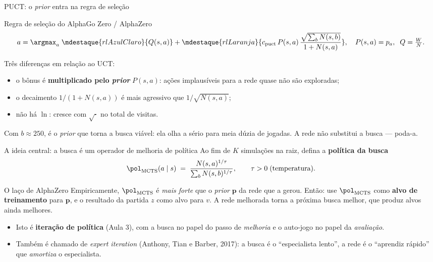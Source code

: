 \documentclass[aspectratio=169, 11pt]{beamer}
\newcommand{\Nv}[1]{N(#1)}                      %
\begin{document}
\begin{frame}{PUCT: o \emph{prior} entra na regra de seleção}
  \begin{teobox}{Regra de seleção do AlphaGo Zero / AlphaZero}
    \[
      a = \argmax_{a}\;
      \mdestaque{rlAzulClaro}{Q(s,a)}
      +
      \mdestaque{rlLaranja}{c_{\text{puct}}\, P(s,a)\,
      \frac{\sqrt{\sum_b \Nv{s,b}}}{1+\Nv{s,a}}},
      \quad P(s,a)=p_a,\;\; Q=\tfrac{W}{N} .
    \]
  \end{teobox}

  \pause
  Três diferenças em relação ao UCT:
  \begin{itemize}
    \item o bônus é \textbf{multiplicado pelo \emph{prior}} $P(s,a)$: ações
          implausíveis para a rede quase não são exploradas;
    \item o decaimento $1/(1+\Nv{s,a})$ é mais agressivo que $1/\sqrt{\Nv{s,a}}$;
    \item não há $\ln$: cresce com $\sqrt{\cdot}$ no total de visitas.
  \end{itemize}

  \pause
  \begin{ideiabox}
    Com $b\approx 250$, é o \emph{prior} que torna a busca viável: ela olha a
    sério para meia dúzia de jogadas. A rede não substitui a busca --- poda-a.
  \end{ideiabox}
\end{frame}

\begin{frame}{A ideia central: a busca é um operador de melhoria de política}
  Ao fim de $K$ simulações na raiz, defina a \textbf{política da busca}
  \[
    \pol_{\text{MCTS}}(a \mid s) \;=\;
    \frac{\Nv{s,a}^{1/\tau}}{\sum_b \Nv{s,b}^{1/\tau}},
    \qquad \tau > 0 \;\text{(temperatura)}.
  \]

  \pause
  \begin{teobox}{O laço de AlphaZero}
    Empiricamente, $\pol_{\text{MCTS}}$ é \emph{mais forte} que o \emph{prior}
    $\bm{p}$ da rede que a gerou. Então: use $\pol_{\text{MCTS}}$ como
    \textbf{alvo de treinamento} para $\bm{p}$, e o resultado da partida $z$
    como alvo para $v$. A rede melhorada torna a próxima busca melhor, que
    produz alvos ainda melhores.
  \end{teobox}

  \pause
  \begin{itemize}
    \item Isto é \textbf{iteração de política} (Aula 3), com a busca no papel do
          passo de \emph{melhoria} e o auto-jogo no papel da \emph{avaliação}.
    \item Também é chamado de \emph{expert iteration} (Anthony, Tian e Barber,
          2017): a busca é o ``especialista lento'', a rede é o ``aprendiz
          rápido'' que \emph{amortiza} o especialista.
  \end{itemize}
\end{frame}
\end{document}
